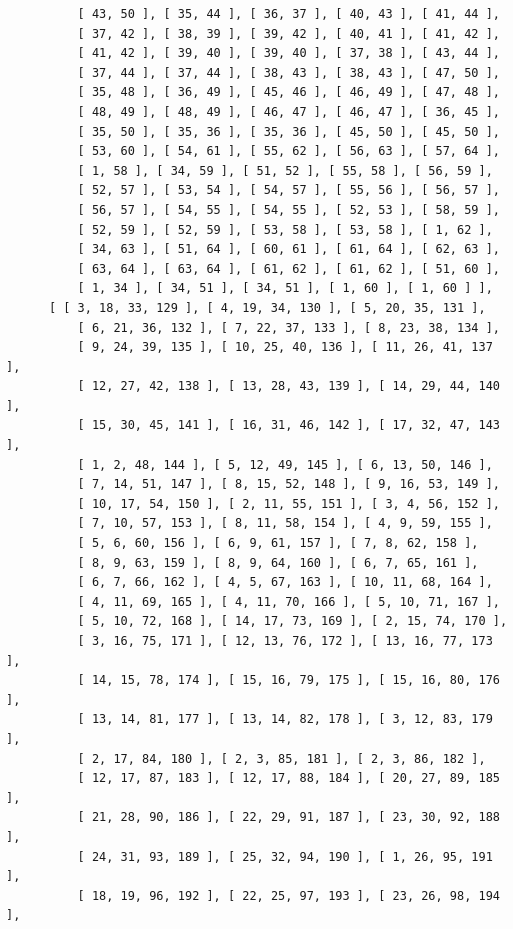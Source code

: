 \documentclass{article}
\begin{document}
\begin{verbatim}
          [ 43, 50 ], [ 35, 44 ], [ 36, 37 ], [ 40, 43 ], [ 41, 44 ], 
          [ 37, 42 ], [ 38, 39 ], [ 39, 42 ], [ 40, 41 ], [ 41, 42 ], 
          [ 41, 42 ], [ 39, 40 ], [ 39, 40 ], [ 37, 38 ], [ 43, 44 ], 
          [ 37, 44 ], [ 37, 44 ], [ 38, 43 ], [ 38, 43 ], [ 47, 50 ], 
          [ 35, 48 ], [ 36, 49 ], [ 45, 46 ], [ 46, 49 ], [ 47, 48 ], 
          [ 48, 49 ], [ 48, 49 ], [ 46, 47 ], [ 46, 47 ], [ 36, 45 ], 
          [ 35, 50 ], [ 35, 36 ], [ 35, 36 ], [ 45, 50 ], [ 45, 50 ], 
          [ 53, 60 ], [ 54, 61 ], [ 55, 62 ], [ 56, 63 ], [ 57, 64 ], 
          [ 1, 58 ], [ 34, 59 ], [ 51, 52 ], [ 55, 58 ], [ 56, 59 ], 
          [ 52, 57 ], [ 53, 54 ], [ 54, 57 ], [ 55, 56 ], [ 56, 57 ], 
          [ 56, 57 ], [ 54, 55 ], [ 54, 55 ], [ 52, 53 ], [ 58, 59 ], 
          [ 52, 59 ], [ 52, 59 ], [ 53, 58 ], [ 53, 58 ], [ 1, 62 ], 
          [ 34, 63 ], [ 51, 64 ], [ 60, 61 ], [ 61, 64 ], [ 62, 63 ], 
          [ 63, 64 ], [ 63, 64 ], [ 61, 62 ], [ 61, 62 ], [ 51, 60 ], 
          [ 1, 34 ], [ 34, 51 ], [ 34, 51 ], [ 1, 60 ], [ 1, 60 ] ], 
      [ [ 3, 18, 33, 129 ], [ 4, 19, 34, 130 ], [ 5, 20, 35, 131 ], 
          [ 6, 21, 36, 132 ], [ 7, 22, 37, 133 ], [ 8, 23, 38, 134 ], 
          [ 9, 24, 39, 135 ], [ 10, 25, 40, 136 ], [ 11, 26, 41, 137 ], 
          [ 12, 27, 42, 138 ], [ 13, 28, 43, 139 ], [ 14, 29, 44, 140 ], 
          [ 15, 30, 45, 141 ], [ 16, 31, 46, 142 ], [ 17, 32, 47, 143 ], 
          [ 1, 2, 48, 144 ], [ 5, 12, 49, 145 ], [ 6, 13, 50, 146 ], 
          [ 7, 14, 51, 147 ], [ 8, 15, 52, 148 ], [ 9, 16, 53, 149 ], 
          [ 10, 17, 54, 150 ], [ 2, 11, 55, 151 ], [ 3, 4, 56, 152 ], 
          [ 7, 10, 57, 153 ], [ 8, 11, 58, 154 ], [ 4, 9, 59, 155 ], 
          [ 5, 6, 60, 156 ], [ 6, 9, 61, 157 ], [ 7, 8, 62, 158 ], 
          [ 8, 9, 63, 159 ], [ 8, 9, 64, 160 ], [ 6, 7, 65, 161 ], 
          [ 6, 7, 66, 162 ], [ 4, 5, 67, 163 ], [ 10, 11, 68, 164 ], 
          [ 4, 11, 69, 165 ], [ 4, 11, 70, 166 ], [ 5, 10, 71, 167 ], 
          [ 5, 10, 72, 168 ], [ 14, 17, 73, 169 ], [ 2, 15, 74, 170 ], 
          [ 3, 16, 75, 171 ], [ 12, 13, 76, 172 ], [ 13, 16, 77, 173 ], 
          [ 14, 15, 78, 174 ], [ 15, 16, 79, 175 ], [ 15, 16, 80, 176 ], 
          [ 13, 14, 81, 177 ], [ 13, 14, 82, 178 ], [ 3, 12, 83, 179 ], 
          [ 2, 17, 84, 180 ], [ 2, 3, 85, 181 ], [ 2, 3, 86, 182 ], 
          [ 12, 17, 87, 183 ], [ 12, 17, 88, 184 ], [ 20, 27, 89, 185 ], 
          [ 21, 28, 90, 186 ], [ 22, 29, 91, 187 ], [ 23, 30, 92, 188 ], 
          [ 24, 31, 93, 189 ], [ 25, 32, 94, 190 ], [ 1, 26, 95, 191 ], 
          [ 18, 19, 96, 192 ], [ 22, 25, 97, 193 ], [ 23, 26, 98, 194 ], 

\end{verbatim}
\end{document}
